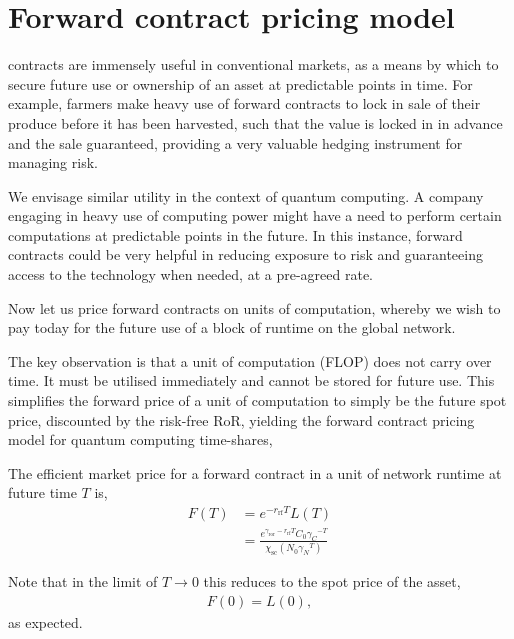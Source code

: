 %
%

\section{Forward contract pricing model}\label{sec:for_contr}

 contracts are immensely useful in conventional markets, as a means by which to secure future use or ownership of an asset at predictable points in time. For example, farmers make heavy use of forward contracts to lock in sale of their produce before it has been harvested, such that the value is locked in in advance and the sale guaranteed, providing a very valuable hedging instrument for managing risk.

We envisage similar utility in the context of quantum computing. A company engaging in heavy use of computing power might have a need to perform certain computations at predictable points in the future. In this instance, forward contracts could be very helpful in reducing exposure to risk and guaranteeing access to the technology when needed, at a pre-agreed rate.

Now let us price forward contracts on units of computation, whereby we wish to pay today for the future use of a block of runtime on the global network.

The key observation is that a unit of computation (FLOP) does not carry over time. It must be utilised immediately and cannot be stored for future use. This simplifies the forward price of a unit of computation to simply be the future spot price, discounted by the risk-free RoR, yielding the forward contract pricing model for quantum computing time-shares,
\begin{definition} \label{def:forward_cont}
The efficient market price for a forward contract in a unit of network runtime at future time $T$ is,
\begin{align}
F(T) &= e^{-r_\mathrm{rf}T} L(T)\nonumber\\
&=\frac{e^{\gamma_\mathrm{ror}-r_\mathrm{rf}T} C_0{\gamma_C}^{-T}}{\chi_\mathrm{sc}(N_0 {\gamma_N}^T)}
\end{align}
\end{definition}

Note that in the limit of \mbox{$T\to 0$} this reduces to the spot price of the asset,
\begin{align}
	F(0)=L(0),
\end{align}
as expected.

